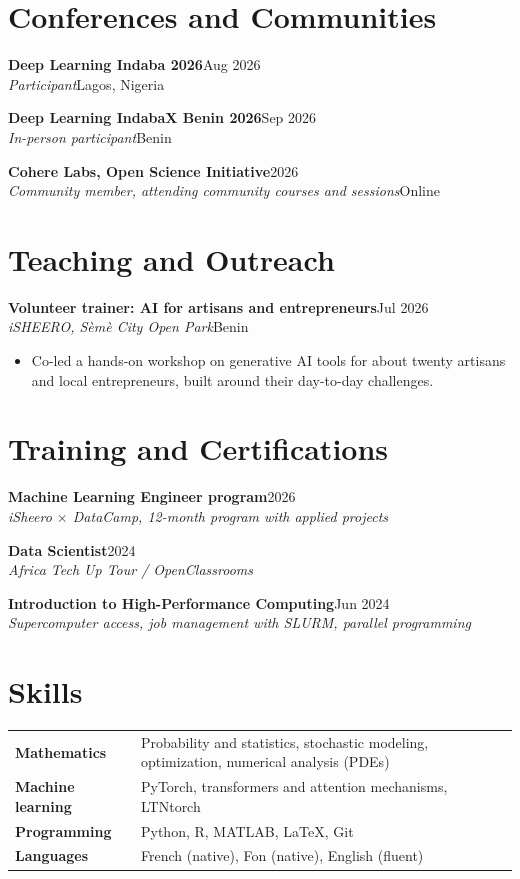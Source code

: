 \documentclass[10pt,a4paper]{article}
\newcommand{\entry}[4]{%
  \textbf{#1}\hfill{\color{muted}#2}\\
  \textit{#3}\hfill{\color{muted}\small #4}\par\vspace{2pt}}
\newcommand{\details}[1]{%
  \begin{itemize}[leftmargin=1.1em, label={\color{muted}\textbullet}, itemsep=1pt, topsep=1pt]
  #1
  \end{itemize}\vspace{5pt}}
\begin{document}
\section{Conferences and Communities}
\entry{Deep Learning Indaba 2026}{Aug 2026}{Participant}{Lagos, Nigeria}
\entry{Deep Learning IndabaX Benin 2026}{Sep 2026}{In-person participant}{Benin}
\entry{Cohere Labs, Open Science Initiative}{2026}{Community member, attending community courses and sessions}{Online}

\section{Teaching and Outreach}
\entry{Volunteer trainer: AI for artisans and entrepreneurs}{Jul 2026}{iSHEERO, Sèmè City Open Park}{Benin}
\details{\item Co-led a hands-on workshop on generative AI tools for about twenty artisans and local entrepreneurs, built around their day-to-day challenges.}

\section{Training and Certifications}
\entry{Machine Learning Engineer program}{2026}{iSheero $\times$ DataCamp, 12-month program with applied projects}{}
\entry{Data Scientist}{2024}{Africa Tech Up Tour / OpenClassrooms}{}
\entry{Introduction to High-Performance Computing}{Jun 2024}{Supercomputer access, job management with SLURM, parallel programming}{}

\section{Skills}
\begin{tabular}{@{}p{3.2cm}p{13cm}@{}}
  \textbf{Mathematics} & Probability and statistics, stochastic modeling, optimization, numerical analysis (PDEs) \\
  \textbf{Machine learning} & PyTorch, transformers and attention mechanisms, LTNtorch \\
  \textbf{Programming} & Python, R, MATLAB, \LaTeX, Git \\
  \textbf{Languages} & French (native), Fon (native), English (fluent) \\
\end{tabular}
\end{document}
